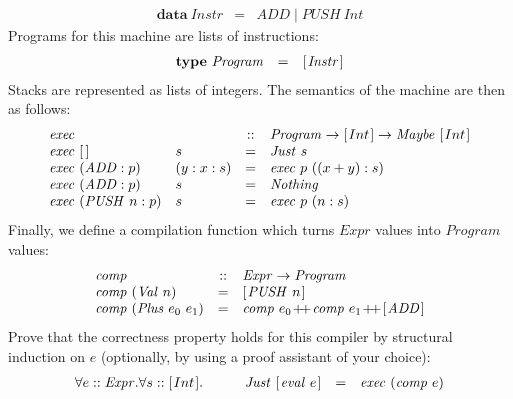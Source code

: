 \documentclass[10pt,a4paper]{exam} %
\begin{document}
\begin{questions}
\begin{displaymath}
\begin{array}{lcl}
\mathbf{data}~\mathit{Instr} & = & \mathit{ADD} \mid \mathit{PUSH}~\mathit{Int}
\end{array}
\end{displaymath}
Programs for this machine are lists of instructions:
\begin{displaymath}
\begin{array}{lcl}
\mathbf{type}~\mathit{Program} & = & [\mskip1.5mu \mathit{Instr} \mskip1.5mu]
\end{array}
\end{displaymath}
Stacks are represented as lists of integers. The semantics of the machine are then as follows:
\begin{displaymath}
\begin{array}{llcl}
\mathit{exec} && :: & \mathit{Program} \to \hslist{Int} \to \mathit{Maybe}~\hslist{Int} \\
\mathit{exec}~\hslist{} & s & = & \mathit{Just}~s \\
\mathit{exec}~(\mathit{ADD} : p) & (y:x:s) & = &\mathit{exec}~p~((x+y):s) \\
\mathit{exec}~(\mathit{ADD} : p) & s & = & \mathit{Nothing} \\
\mathit{exec}~(\mathit{PUSH}~n:p) & s & = & \mathit{exec}~p~(n:s)
\end{array}
\end{displaymath}
Finally, we define a compilation function which turns $\mathit{Expr}$ values into $\mathit{Program}$ values:
\begin{displaymath}
\begin{array}{lcl}
\mathit{comp} & :: & \mathit{Expr} \to \mathit{Program} \\
\mathit{comp}~(\mathit{Val}~n) & = & \hslist{\mathit{PUSH}~n} \\
\mathit{comp}~(\mathit{Plus}~e_0~e_1) & = & \mathit{comp}~e_0 \append \mathit{comp}~e_1 \append \hslist{\mathit{ADD}}
\end{array}
\end{displaymath}
Prove that the correctness property holds for this compiler by structural induction on $e$ (optionally, by using a proof assistant of your choice):
\begin{displaymath}
\begin{array}{llcl}
\forall e :: \mathit{Expr}.\forall s :: [\mskip1.5mu Int \mskip1.5mu]. \qquad & \mathit{Just}~[\mskip1.5mu \mathit{eval}~e \mskip1.5mu] & = & \mathit{exec}~(\mathit{comp}~e)
\end{array}
\end{displaymath}


\end{questions}
\end{document}
